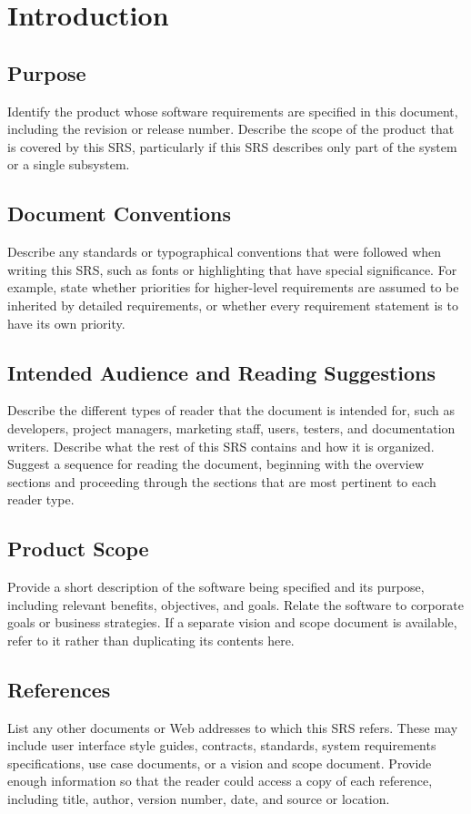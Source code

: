 \documentclass[a4paper,10pt]{article}
\begin{document}
\section{Introduction}
\subsection{Purpose}
Identify the product whose software requirements are specified in this document, including the revision or release number. Describe the scope of the product that is covered by this SRS, particularly if this SRS describes only part of the system or a single subsystem.
\subsection{Document Conventions}
Describe any standards or typographical conventions that were followed when writing this SRS, such as fonts or highlighting that have special significance. For example, state whether priorities  for higher-level requirements are assumed to be inherited by detailed requirements, or whether every requirement statement is to have its own priority.
\subsection{Intended Audience and Reading Suggestions}
Describe the different types of reader that the document is intended for, such as developers, project managers, marketing staff, users, testers, and documentation writers. Describe what the rest of this SRS contains and how it is organized. Suggest a sequence for reading the document, beginning with the overview sections and proceeding through the sections that are most pertinent to each reader type.
\subsection{Product Scope}
Provide a short description of the software being specified and its purpose, including relevant benefits, objectives, and goals. Relate the software to corporate goals or business strategies. If a separate vision and scope document is available, refer to it rather than duplicating its contents here.
\subsection{References}
List any other documents or Web addresses to which this SRS refers. These may include user interface style guides, contracts, standards, system requirements specifications, use case documents, or a vision and scope document. Provide enough information so that the reader could access a copy of each reference, including title, author, version number, date, and source or location.
\end{document}

